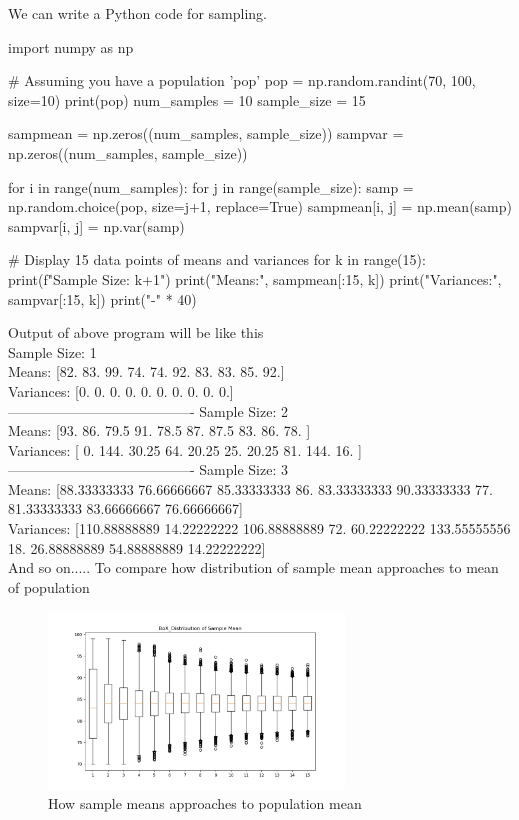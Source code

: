 \documentclass[12pt,a4paper]{article}
\theoremstyle{example}
\theoremstyle{definition}
\theoremstyle{theorem}
\begin{document}
We can write a Python code for sampling. 
\begin{python}
    import numpy as np

# Assuming you have a population 'pop'
pop = np.random.randint(70, 100, size=10)
print(pop)
num_samples = 10
sample_size = 15

sampmean = np.zeros((num_samples, sample_size))
sampvar = np.zeros((num_samples, sample_size))

for i in range(num_samples):
    for j in range(sample_size):
        samp = np.random.choice(pop, size=j+1, replace=True)
        sampmean[i, j] = np.mean(samp)
        sampvar[i, j] = np.var(samp)

# Display 15 data points of means and variances
for k in range(15):
    print(f"Sample Size: {k+1}")
    print("Means:", sampmean[:15, k])
    print("Variances:", sampvar[:15, k])
    print("-" * 40)

\end{python}
Output of above program will be like this \\
Sample Size: 1\\
Means: [82. 83. 99. 74. 74. 92. 83. 83. 85. 92.]\\
Variances: [0. 0. 0. 0. 0. 0. 0. 0. 0. 0.]\\
----------------------------------------
Sample Size: 2\\
Means: [93.  86.  79.5 91.  78.5 87.  87.5 83.  86.  78. ]\\
Variances: [  0.   144.    30.25  64.    20.25  25.    20.25  81.   144.    16.  ]\\
----------------------------------------
Sample Size: 3\\
Means: [88.33333333 76.66666667 85.33333333 86.         83.33333333 90.33333333
 77.         81.33333333 83.66666667 76.66666667]\\
Variances: [110.88888889  14.22222222 106.88888889  72.          60.22222222
 133.55555556  18.          26.88888889  54.88888889  14.22222222]\\
 And so on.....
 To compare how distribution of sample mean approaches to mean of population 
 \begin{figure}
     \centering
     \includegraphics[width=0.7\textwidth]{BoX_Distribution of Sample Mean.png}
     \caption{How sample means approaches to population mean}
     \label{mean_box}
 \end{figure}
\end{document}
